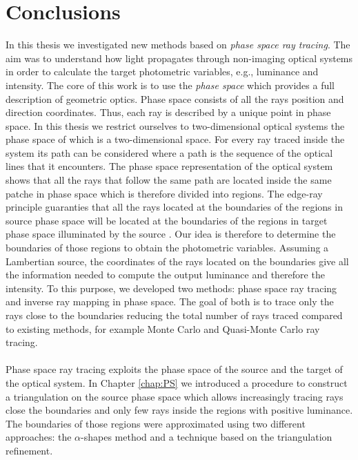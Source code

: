 \chapter{Conclusions}\label{chap:conclusions}
In this thesis we investigated new methods based on \textit{phase space ray tracing}. The aim was to understand how light propagates through non-imaging optical systems in order to calculate the target photometric variables, e.g., luminance and intensity. 
The core of this work is to use the \textit{phase space} which provides a full description of geometric optics. Phase space consists of all the rays position and direction coordinates. Thus, each ray is described by a unique point in phase space. In this thesis we restrict ourselves to two-dimensional optical systems the phase space of which is a two-dimensional space. For every ray traced inside the system its path can be considered where a path is the sequence of the optical lines that it encounters. The phase space representation of the optical system shows that all the rays that follow the same path are located inside the same patche in phase space which is therefore divided into regions. The edge-ray principle guaranties that all the rays located at the boundaries of the regions in source phase space will be located at the boundaries of the regions in target phase space illuminated by the source \cite{Ries:2}. Our idea is therefore to determine the boundaries of those regions to obtain the photometric variables. Assuming a Lambertian source, the coordinates of the rays located on the boundaries give all the information needed to compute the output luminance and therefore the intensity.
To this purpose, we developed two methods: phase space ray tracing and inverse ray mapping in phase space. The goal of both is to trace only the rays close to the boundaries reducing the total number of rays traced compared to existing methods, for example Monte Carlo and Quasi-Monte Carlo ray tracing.
\\ \\ \indent Phase space ray tracing exploits the phase space of the source and the target of the optical system. In Chapter \ref{chap:PS} we introduced a procedure to construct a triangulation on the source phase space which allows increasingly tracing rays close the boundaries and only few rays inside the regions with positive luminance. 
The boundaries of those regions were approximated using two different approaches: the $\alpha$-shapes method and a technique based on the triangulation refinement. \\ \indent 
